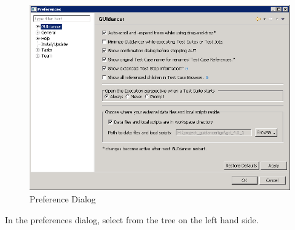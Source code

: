 \label{gdprefs}

\begin{figure}[h]
\begin{center}
\includegraphics[width=12.5cm]{Tasks/Preferences/PS/gdprefs}
\caption{\app{} Preference Dialog}
\label{gdprefs}
\end{center}
\end{figure}

 In the preferences dialog, select  from the tree on the left hand side.

